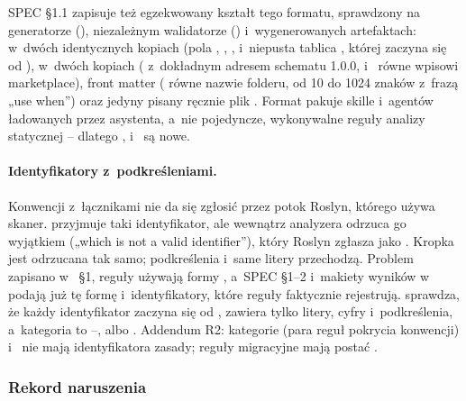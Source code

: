 SPEC §1.1 zapisuje też egzekwowany kształt tego formatu, sprawdzony na generatorze
(), niezależnym walidatorze
() i~wygenerowanych artefaktach:
 w~dwóch identycznych kopiach (pola ,
, , 
i~niepusta tablica , której  zaczyna się od
),  w~dwóch kopiach ( z~dokładnym
adresem schematu 1.0.0,  i~ równe wpisowi marketplace),
front matter  ( równe nazwie folderu,
 od 10 do 1024 znaków z~frazą „use when”) oraz jedyny pisany ręcznie
plik . Format pakuje skille i~agentów ładowanych przez
asystenta, a~nie pojedyncze, wykonywalne reguły analizy statycznej -- dlatego
,  i~ są nowe.

\paragraph{Identyfikatory z~podkreśleniami.} Konwencji z~łącznikami nie da się zgłosić
przez potok Roslyn, którego używa skaner.  przyjmuje taki
identyfikator, ale  wewnątrz analyzera odrzuca go wyjątkiem
 („which is not a valid identifier”), który Roslyn zgłasza jako
. Kropka jest odrzucana tak samo; podkreślenia i~same litery przechodzą.
Problem zapisano w~ §1, reguły używają formy
, a~SPEC §1--2 i~makiety wyników w~
podają już tę formę i~identyfikatory, które reguły faktycznie rejestrują.  sprawdza, że
każdy identyfikator zaczyna się od , zawiera tylko litery, cyfry
i~podkreślenia, a~kategoria to --,  albo
. Addendum R2: kategorie  (para reguł pokrycia
konwencji) i~ nie mają identyfikatora zasady; reguły migracyjne mają
postać .

\subsubsection{Rekord naruszenia}

